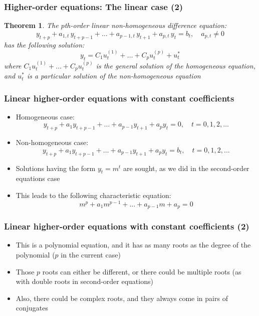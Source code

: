 \documentclass[10pt,usenames,dvipsnames]{beamer}
\theoremstyle{plain}
\newtheorem{thm}{Theorem}
\theoremstyle{definition}
\begin{document}
\begin{frame}[fragile]
\frametitle{Higher-order equations: The linear case (2)}
\begin{thm}
	The  $p$th-order linear non-homogeneous difference equation:
	\[
		y_{t+p} + a_{1,t} \, y_{t+p-1} + \ldots + a_{p-1,t} \, y_{t+1} + a_{p,t} \, y_{t} = b_{t}, \quad a_{p,t} \neq 0
	\]
	has the following solution:
	\[
		y_{t} = C_{1}u_{t}^{(1)} + \ldots + C_{p}u_{t}^{(p)} + u_{t}^{*}
	\]
	where $C_{1}u_{t}^{(1)} + \ldots + C_{p}u_{t}^{(p)}$ is the general solution of the homogeneous equation, and $u_{t}^{*}$ is a particular solution of the non-homogeneous equation
\end{thm}
\end{frame}

\begin{frame}[fragile]
\frametitle{Linear higher-order equations with constant coefficients}
\begin{itemize}
	\item Homogeneous case:
	\[
		y_{t+p} + a_{1}y_{t+p-1} + \ldots + a_{p-1}y_{t+1} + a_{p}y_{t} = 0, \quad t = 0, 1, 2, \ldots
	\]
	\item Non-homogeneous case:
	\[
		y_{t+p} + a_{1}y_{t+p-1} + \ldots + a_{p-1}y_{t+1} + a_{p}y_{t} = b_{t}, \quad t = 0, 1, 2, \ldots
	\]
	\item Solutions having the form $y_{t} = m^{t}$ are sought, as we did in the second-order equations case
	\item This leads to the following characteristic equation:
	\[
		m^{p} + a_{1}m^{p-1} + \ldots + a_{p-1}m + a_{p} = 0
	\]
	
\end{itemize}
\end{frame}

\begin{frame}[fragile]
\frametitle{Linear higher-order equations with constant coefficients (2)}
\begin{itemize}
	\item This is a polynomial equation, and it has as many roots as the degree of the polynomial ($p$ in the current case)
	\item Those $p$ roots can either be different, or there could be multiple roots (as with double roots in second-order equations)
	\item Also, there could be complex roots, and they always come in pairs of conjugates
\end{itemize}
\end{frame}
\end{document}
